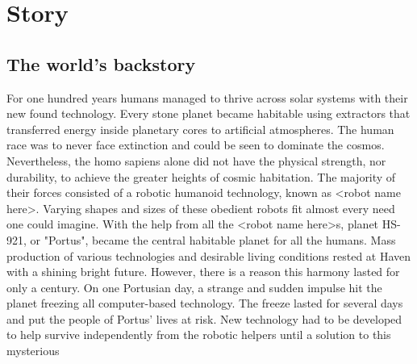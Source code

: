\documentclass[../Main.tex]{subfiles}
\begin{document}
\section{Story}


\subsection{The world's backstory}

For one hundred years humans managed to thrive across solar systems with their new found technology. Every stone planet became habitable using extractors that transferred energy inside planetary cores to artificial atmospheres. The human race was to never face extinction and could be seen to dominate the cosmos. Nevertheless, the homo sapiens alone did not have the physical strength, nor durability, to achieve the greater heights of cosmic habitation. The majority of their forces consisted of a robotic humanoid technology, known as <robot name here>. Varying shapes and sizes of these obedient robots fit almost every need one could imagine. With the help from all the <robot name here>s, planet HS-921, or "Portus", became the central habitable planet for all the humans. Mass production of various technologies and desirable living conditions rested at Haven with a shining bright future. However, there is a reason this harmony lasted for only a century. On one Portusian day, a strange and sudden impulse hit the planet freezing all computer-based technology. The freeze lasted for several days and put the people of Portus' lives at risk. New technology had to be developed to help survive independently from the robotic helpers until a solution to this mysterious 
\end{document}
